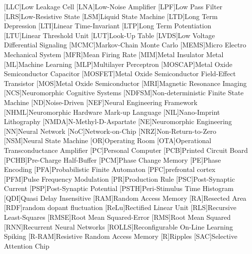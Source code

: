 [LLC]{Low Leakage Cell}
[LNA]{Low-Noise Amplifier}
[LPF]{Low Pass Filter}
[LRS]{Low-Resistive State}
[LSM]{Liquid State Machine}
[LTD]{Long Term Depression}
[LTI]{Linear Time-Invariant}
[LTP]{Long Term Potentiation}
[LTU]{Linear Threshold Unit}
[LUT]{Look-Up Table}
[LVDS]{Low Voltage Differential Signaling}
[MCMC]{Markov-Chain Monte Carlo}
[MEMS]{Micro Electro Mechanical System}
[MFR]{Mean Firing Rate}
[MIM]{Metal Insulator Metal}
[ML]{Machine Learning}
[MLP]{Multilayer Perceptron}
[MOSCAP]{Metal Oxide Semiconductor Capacitor}
[MOSFET]{Metal Oxide Semiconductor Field-Effect Transistor}
[MOS]{Metal Oxide Semiconductor}
[MRI]{Magnetic Resonance Imaging}
[NCS]{Neuromorphic Cognitive Systems}
[NDFSM]{Non-deterministic Finite State Machine} 
[ND]{Noise-Driven}
[NEF]{Neural Engineering Framework}
[NHML]{Neuromorphic Hardware Mark-up Language}
[NIL]{Nano-Imprint Lithography}
[NMDA]{N-Methyl-D-Aspartate}
[NE]{Neuromorphic Engineering}
[NN]{Neural Network}
[NoC]{Network-on-Chip}
[NRZ]{Non-Return-to-Zero}
[NSM]{Neural State Machine}
[OR]{Operating Room}
[OTA]{Operational Transconductance Amplifier}
[PC]{Personal Computer}
[PCB]{Printed Circuit Board}
[PCHB]{Pre-Charge Half-Buffer}
[PCM]{Phase Change Memory}
[PE]{Phase Encoding}
[PFA]{Probabilistic Finite Automaton}
[PFC]{prefrontal cortex}
[PFM]{Pulse Frequency Modulation}
[PR]{Production Rule}
[PSC]{Post-Synaptic Current}
[PSP]{Post-Synaptic Potential}
[PSTH]{Peri-Stimulus Time Histogram}
[QDI]{Quasi Delay Insensitive}
[RAM]{Random Access Memory}
[RA]{Resected Area}
[RDF]{random dopant fluctuation}
[ReLu]{Rectified Linear Unit}
[RLS]{Recursive Least-Squares}
[RMSE]{Root Mean Squared-Error}
[RMS]{Root Mean Squared}
[RNN]{Recurrent Neural Networks}
[ROLLS]{Reconfigurable On-Line Learning Spiking}
[R-RAM]{Resistive Random Access Memory}
[R]{Ripples}
[SAC]{Selective Attention Chip}
